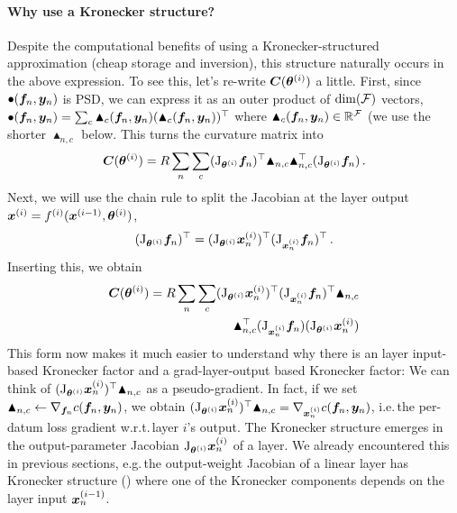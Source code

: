 \paragraph{Why use a Kronecker structure?}
Despite the computational benefits of using a Kronecker-structured approximation (cheap storage and inversion), this structure naturally occurs in the above expression.
To see this, let's re-write ${\bm{C}}({\bm{\theta}}^{(i)})$ a little.
First, since $\bullet({\bm{f}}_n, {\bm{y}}_n)$ is PSD, we can express it as an outer product of $\dim({\mathcal{F}})$ vectors,
$\bullet({\bm{f}}_n, {\bm{y}}_n) = \sum_{c} \blacktriangle_c({\bm{f}}_n, {\bm{y}}_n) (\blacktriangle_c({\bm{f}}_n, {\bm{y}}_n))^{\top}$ where $\blacktriangle_c({\bm{f}}_n, {\bm{y}}_n) \in {\mathbb{R}}^{{\mathcal{F}}}$ (we use the shorter $\blacktriangle_{n,c}$ below. This turns the curvature matrix into
\begin{align}\label{eq:curvature_matrix}
  {\bm{C}}({\bm{\theta}}^{(i)})
  =
  R \sum_n \sum_{c}
  (\mathrm{J}_{{\bm{\theta}}^{(i)}} {\bm{f}}_n)^{\top}
  \blacktriangle_{n,c} \blacktriangle_{n,c}^{\top}
  (\mathrm{J}_{{\bm{\theta}}^{(i)}} {\bm{f}}_n)\,.
\end{align}
Next, we will use the chain rule to split the Jacobian at the layer output ${\bm{x}}^{(i)} = f^{(i)}({\bm{x}}^{(i-1)}, {\bm{\theta}}^{(i)})$,
\begin{align*}
  (\mathrm{J}_{{\bm{\theta}}^{(i)}} {\bm{f}}_n)^{\top}
  =
  (\mathrm{J}_{{\bm{\theta}}^{(i)}} {\bm{x}}^{(i)}_n)^{\top}
  (\mathrm{J}_{{\bm{x}}_n^{(i)}} {\bm{f}}_n)^{\top}\,.
\end{align*}
Inserting this, we obtain
\begin{align*}
  {\bm{C}}({\bm{\theta}}^{(i)})
  =
  R \sum_n \sum_{c}
  (\mathrm{J}_{{\bm{\theta}}^{(i)}} {\bm{x}}^{(i)}_n)^{\top}
  (\mathrm{J}_{{\bm{x}}_n^{(i)}} {\bm{f}}_n)^{\top}
  \blacktriangle_{n,c}
  \\
  \blacktriangle_{n,c}^{\top}
  (\mathrm{J}_{{\bm{x}}_n^{(i)}} {\bm{f}}_n)
  (\mathrm{J}_{{\bm{\theta}}^{(i)}} {\bm{x}}^{(i)}_n)
\end{align*}
This form now makes it much easier to understand why there is an layer input-based Kronecker factor and a grad-layer-output based Kronecker factor: We can think of $(\mathrm{J}_{{\bm{\theta}}^{(i)}} {\bm{x}}_n^{(i)})^{\top} \blacktriangle_{n,c}$ as a pseudo-gradient.
In fact, if we set $\blacktriangle_{n,c} \leftarrow \nabla_{{\bm{f}}_n} c({\bm{f}}_n, {\bm{y}}_n)$, we obtain $(\mathrm{J}_{{\bm{\theta}}^{(i)}} {\bm{x}}_n^{(i)})^{\top} \blacktriangle_{n,c} = \nabla_{{\bm{x}}_n^{(i)}} c({\bm{f}}_n, {\bm{y}}_n)$, i.e.\,the per-datum loss gradient w.r.t.\,layer $i$'s output.
The Kronecker structure emerges in the output-parameter Jacobian $\mathrm{J}_{{\bm{\theta}}^{(i)}} {\bm{x}}_n^{(i)}$ of a layer.
We already encountered this in previous sections, e.g.\,the output-weight Jacobian of a linear layer has Kronecker structure () where one of the Kronecker components depends on the layer input ${\bm{x}}^{(i-1)}_n$.

